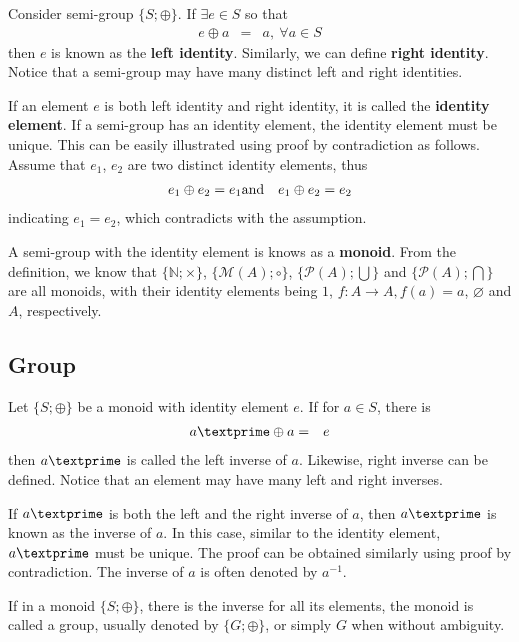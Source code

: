 Consider semi-group $\{S; \oplus\}$. If $\exists e\in S$ so that
\begin{eqnarray}
	e\oplus a &=& a, ~\forall a \in S \nonumber
\end{eqnarray}
then $e$ is known as the \textbf{left identity}. Similarly, we can define \textbf{right identity}. Notice that a semi-group may have many distinct left and right identities.

If an element $e$ is both left identity and right identity, it is called the \textbf{identity element}. If a semi-group has an identity element, the identity element must be unique. This can be easily illustrated using proof by contradiction as follows. Assume that $e_1$, $e_2$ are two distinct identity elements, thus
\begin{eqnarray}
	e_1\oplus e_2 = e_1 &\textup{and}& e_1\oplus e_2 = e_2 \nonumber
\end{eqnarray}
indicating $e_1=e_2$, which contradicts with the assumption.

A semi-group with the identity element is knows as a \textbf{monoid}. From the definition, we know that $\{\mathbb{N}; \times\}$, $\{\mathcal{M}(A); \circ\}$, $\{\mathcal{P}(A); \bigcup\}$ and $\{\mathcal{P}(A); \bigcap\}$ are all monoids, with their identity elements being $1$, $f: A\rightarrow A, f(a)=a$, $\varnothing$ and $A$, respectively.

\subsection{Group}

Let $\{S; \oplus\}$ be a monoid with identity element $e$. If for $a\in S$, there is
\begin{eqnarray}
	a\textprime \oplus a &=& e \nonumber
\end{eqnarray}
then $a\textprime$ is called the left inverse of $a$. Likewise, right inverse can be defined. Notice that an element may have many left and right inverses.

If $a\textprime$ is both the left and the right inverse of $a$, then $a\textprime$ is known as the inverse of $a$. In this case, similar to the identity element, $a\textprime$ must be unique. The proof can be obtained similarly using proof by contradiction. The inverse of $a$ is often denoted by $a^{-1}$.

If in a monoid $\{S; \oplus\}$, there is the inverse for all its elements, the monoid is called a group, usually denoted by $\{G; \oplus\}$, or simply $G$ when without ambiguity.


